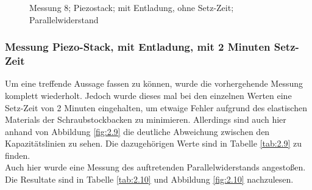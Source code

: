 \documentclass[12pt]{scrreprt} %
\begin{document}
\begin {figure}[htbp]
      \begin{center}
      \end{center}
\caption[Messung 8; ohne Setz-Zeit; Parallelwiderstand]{Messung 8; Piezostack; mit Entladung, ohne Setz-Zeit; Parallelwiderstand}
\label{fig:2.8}
\end{figure}

\newpage
\subsubsection{Messung Piezo-Stack, mit Entladung, mit 2 Minuten Setz-Zeit}
Um eine treffende Aussage fassen zu können, wurde die vorhergehende Messung komplett wiederholt. Jedoch wurde dieses mal bei den einzelnen Werten eine Setz-Zeit von 2 Minuten eingehalten, um etwaige Fehler aufgrund des elastischen Materials der Schraubstockbacken zu minimieren. Allerdings sind auch hier anhand von Abbildung \vref{fig:2.9} die deutliche Abweichung zwischen den Kapazitätslinien zu sehen. Die dazugehörigen Werte sind in Tabelle \vref{tab:2.9} zu finden.\\
Auch hier wurde eine Messung des auftretenden Parallelwiderstands angestoßen. Die Resultate sind in Tabelle \vref{tab:2.10} und Abbildung \vref{fig:2.10} nachzulesen.
\end{document}
